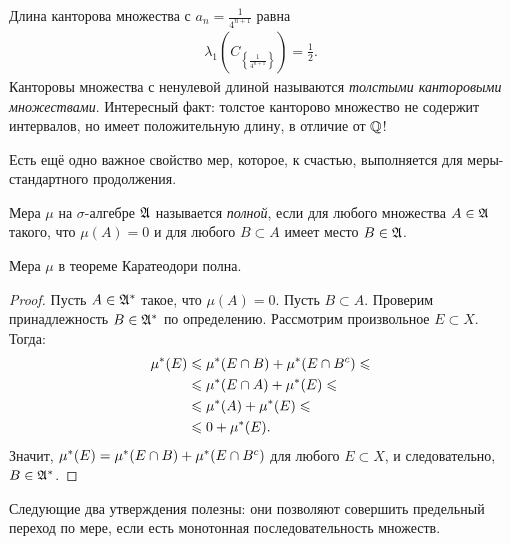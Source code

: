 \begin{exmpl}
\begin{enumerate}
   Длина канторова множества с $a_n = \frac{1}{4^{n+1}}$ равна
   \begin{align*}
    \lambda_1 \left( C_{\left\{ \frac{1}{4^{n+1}} \right\}} \right) = \frac{1}{2}
   .\end{align*} Канторовы множества с ненулевой длиной называются \textit{толстыми канторовыми множествами}. Интересный факт: толстое канторово множество не содержит интервалов, но имеет положительную длину, в отличие от $\mathbb{Q}$!
 \end{enumerate}
\end{exmpl}

Есть ещё одно важное свойство мер, которое, к счастью, выполняется для меры-стандартного продолжения.

\begin{df}
 Мера $\mu$ на $\sigma$-алгебре $\mathfrak{A}$ называется \textit{полной}, если для любого множества $A \in \mathfrak{A}$ такого, что $\mu(A) = 0$ и для любого  $B \subset A$ имеет место $B \in \mathfrak{A}$.
\end{df}
\begin{remrk}
 Мера $\mu$ в теореме Каратеодори полна.
\end{remrk}
\begin{proof}
 Пусть $A \in \mathfrak{A}^{\ast}$ такое, что $\mu(A) = 0$. Пусть  $B \subset A$. Проверим принадлежность $B \in \mathfrak{A}^{\ast}$ по определению. Рассмотрим произвольное $E \subset X$. Тогда:
 \begin{align*}
  \mu^\ast(E) & \leqslant \mu^\ast(E \cap B) + \mu^\ast(E \cap B^{c}) \leqslant \\
  & \leqslant \mu^\ast(E \cap A) + \mu^\ast(E) \leqslant \\
  & \leqslant \mu^\ast(A) + \mu^\ast(E) \leqslant \\
  & \leqslant 0 + \mu^\ast(E)
 .\end{align*} Значит, $\mu^\ast(E) = \mu^\ast(E \cap B) + \mu^\ast(E \cap B^{c})$ для любого $E \subset X$, и следовательно, $B \in \mathfrak{A}^{\ast}$.
\end{proof}

Следующие два утверждения полезны: они позволяют совершить предельный переход по мере, если есть монотонная последовательность множеств.

